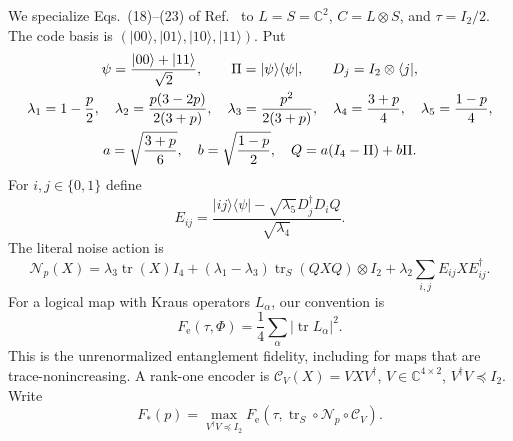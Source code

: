 \documentclass[11pt]{article}
\newcommand{\ket}[1]{\lvert #1\rangle}
\newcommand{\bra}[1]{\langle #1\rvert}
\newcommand{\tr}{\operatorname{tr}}
\newcommand{\N}{\mathcal N}
\newcommand{\C}{\mathcal C}
\newcommand{\F}{F_{\mathrm e}}
\begin{document}
We specialize Eqs.~(18)--(23) of Ref.~\cite{LiJiang} to
$L=S=\mathbb C^2$, $C=L\otimes S$, and $\tau=I_2/2$.
The code basis is $(\ket{00},\ket{01},\ket{10},\ket{11})$. Put
\begin{gather}
 \psi=\frac{\ket{00}+\ket{11}}{\sqrt2},\qquad
 \Pi=\ket\psi\bra\psi,\qquad D_j=I_2\otimes\bra j,\notag\\
 \lambda_1=1-\frac p2,\quad
 \lambda_2=\frac{p(3-2p)}{2(3+p)},\quad
 \lambda_3=\frac{p^2}{2(3+p)},\quad
 \lambda_4=\frac{3+p}{4},\quad \lambda_5=\frac{1-p}{4},\label{eq:lambda}\\
 a=\sqrt{\frac{3+p}{6}},\quad b=\sqrt{\frac{1-p}{2}},\quad
 Q=a(I_4-\Pi)+b\Pi.\notag
\end{gather}
For $i,j\in\{0,1\}$ define
\[
 E_{ij}=\frac{\ket{ij}\bra\psi-\sqrt{\lambda_5}D_j^\dagger D_iQ}
 {\sqrt{\lambda_4}}.
\]
The literal noise action is
\begin{equation}\label{eq:noise}
 \N_p(X)=\lambda_3\tr(X)I_4+
 (\lambda_1-\lambda_3)\tr_S(QXQ)\otimes I_2
 +\lambda_2\sum_{i,j}E_{ij}XE_{ij}^\dagger.
\end{equation}
For a logical map with Kraus operators $L_\alpha$, our convention is
\begin{equation}\label{eq:fidelity}
 \F(\tau,\Phi)=\frac14\sum_\alpha|\tr L_\alpha|^2.
\end{equation}
This is the unrenormalized entanglement fidelity, including for maps that
are trace-nonincreasing. A rank-one encoder is
$\C_V(X)=VXV^\dagger$, $V\in\mathbb C^{4\times2}$,
$V^\dagger V\preceq I_2$. Write
\[
 F_*(p)=\max_{V^\dagger V\preceq I_2}
 \F(\tau,\tr_S\circ\N_p\circ\C_V).
\]
\end{document}

